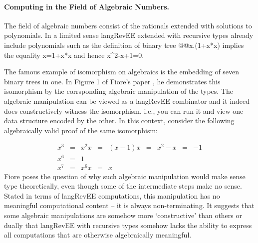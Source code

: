 \documentclass[preprint]{sigplanconf}
\begin{document}

\paragraph*{Computing in the Field of Algebraic Numbers.}
\label{sec:algebraic-field}
The field of algebraic numbers consist of the rationals extended with
solutions to polynomials. In a limited sense {{langRevEE}} extended
with recursive types already include polynomials such as the
definition of binary tree {{@@x.(1+x*x)}} implies the equality
{{x=1+x*x}} and hence {{x^2-x+1=0}}. 



The famous example of isomorphism on algebraics is the embedding of
seven binary trees in one. In Figure 1 of Fiore's paper
\cite{Fiore:2004}, he demonstrates this isomorphism by the
corrsponding algebraic manipulation of the types.  The algebraic
manipulation can be viewed as a {{langRevEE}} combinator and it indeed
does constructively witness the isomorphism, i.e., you can run it and
view one data structure encoded by the other. In this context,
consider the following algebraically valid proof of the same
isomorphism:

\[\begin{array}{rclclclcl}
x^3 &=& x^2 x &=& (x-1) x &=& x^2 - x &=& -1 \\
x^6 &=& 1 \\
x^7 &=& x^6 x &=& x
\end{array}\]
Fiore poses the question of why such algebraic manipulation would make
sense type theoretically, even though some of the intermediate steps
make no sense.  Stated in terms of {{langRevEE}} computations, this
manipulation has no meaningful computational content -- it is always
non-terminating. It suggests that some algebraic manipulations are
somehow more `constructive' than others or dually that {{langRevEE}}
with recursive types somehow lacks the ability to express all
computations that are otherwise algebraically meaningful.
\end{document}
